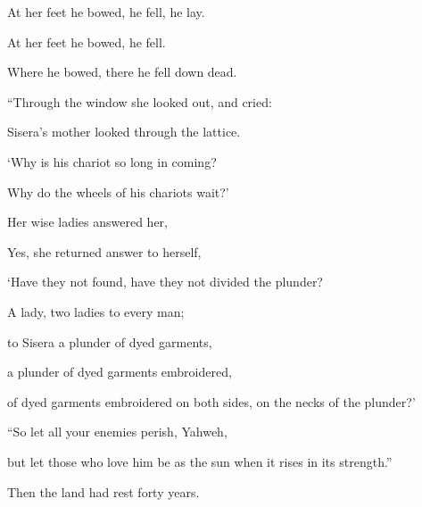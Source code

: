 {\par }{\Q {}At her feet he bowed, he fell, he lay.
\par }{\QB At her feet he bowed, he fell.
\par }{\QB Where he bowed, there he fell down dead.
\par }{\BB \par }{\Q {}“Through the window she looked out, and cried:
\par }{\QB Sisera’s mother looked through the lattice.
\par }{\Q ‘Why is his chariot so long in coming?
\par }{\QB Why do the wheels of his chariots wait?’
\par }{\Q {}Her wise ladies answered her,
\par }{\QB Yes, she returned answer to herself,
\par }{\Q {}‘Have they not found, have they not divided the plunder?
\par }{\QB A lady, two ladies to every man;
\par }{\Q to Sisera a plunder of dyed garments,
\par }{\QB a plunder of dyed garments embroidered,
\par }{\QB of dyed garments embroidered on both sides, on the necks of the plunder?’
\par }{\BB \par }{\Q {}“So let all your enemies perish, Yahweh,
\par }{\QB but let those who love him be as the sun when it rises in its strength.”
\par }{\BB \par }{\PP Then the land had rest forty years.

}
